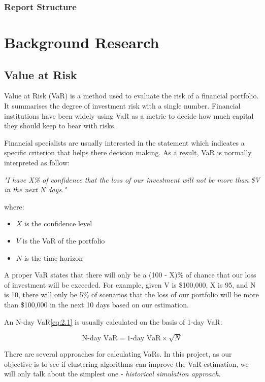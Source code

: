 \documentclass[11pt]{article} %
\theoremstyle{plain}
\theoremstyle{definition}
\begin{document}
\subsubsection{Report Structure}

\section{Background Research}
\subsection{Value at Risk}
Value at Risk (VaR) is a method used to evaluate the risk of a financial portfolio. It summarises the degree of investment risk with a single number. Financial institutions have been widely using VaR as a metric to decide how much capital they should keep to bear with risks.

Financial specialists are usually interested in the statement which indicates a specific criterion that helps there decision making. As a result, VaR is normally interpreted as follow:

\textsl{"I have X\% of confidence that the loss of our investment will not be more than \$V in the next N days."}

{
  \footnotesize
  where:
  \begin{itemize}[label=-, leftmargin=4em, itemsep=0.1em]
    \item ${X}$ is the confidence level
    \item ${V}$ is the VaR of the portfolio
    \item ${N}$ is the time horizon
  \end{itemize}
}

A proper VaR states that there will only be a (100 - X)\% of chance that our loss of investment will be exceeded. For example, given V is \$100,000, X is 95, and N is 10, there will only be 5\% of scenarios that the loss of our portfolio will be more than \$100,000 in the next 10 days based on our estimation.

An N-day VaR\eqref{eq:2.1} is usually calculated on the basis of 1-day VaR:

\begin{equation}
  \label{eq:2.1}
  \tag{2.1}
  {\text{N-day VaR} = \text{1-day VaR} \times \sqrt{N}}
\end{equation}

There are several approaches for calculating VaRs. In this project, as our objective is to see if clustering algorithms can improve the VaR estimation, we will only talk about the simplest one - \textsl{historical simulation approach}\cite{john/ofaod:2017}.
\end{document}
